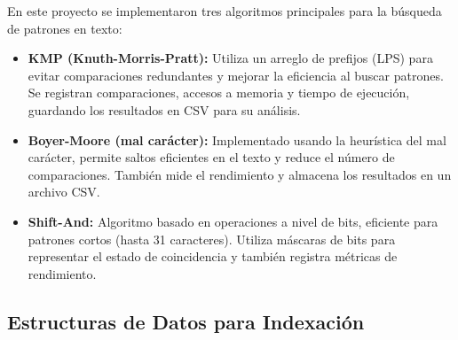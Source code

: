 \documentclass[9pt,letterpaper,onecolumn]{rho-class/rho}
\begin{document}
En este proyecto se implementaron tres algoritmos principales para la búsqueda de patrones en texto:

\begin{itemize}
    \item \textbf{KMP (Knuth-Morris-Pratt):} Utiliza un arreglo de prefijos (LPS) para evitar comparaciones redundantes y mejorar la eficiencia al buscar patrones. Se registran comparaciones, accesos a memoria y tiempo de ejecución, guardando los resultados en CSV para su análisis.
    \item \textbf{Boyer-Moore (mal carácter):} Implementado usando la heurística del mal carácter, permite saltos eficientes en el texto y reduce el número de comparaciones. También mide el rendimiento y almacena los resultados en un archivo CSV.
    \item \textbf{Shift-And:} Algoritmo basado en operaciones a nivel de bits, eficiente para patrones cortos (hasta 31 caracteres). Utiliza máscaras de bits para representar el estado de coincidencia y también registra métricas de rendimiento.
\end{itemize}




\subsection{Estructuras de Datos para Indexación}
\end{document}
